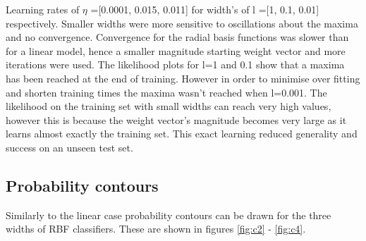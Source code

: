 \documentclass[twoside,twocolumn]{article}
\begin{document}
Learning rates of $\eta$ =[0.0001, 0.015, 0.011] for width's of l =[1, 0.1, 0.01] respectively. Smaller widths were more sensitive to oscillations about the maxima and no convergence. Convergence for the radial basis functions was slower than for a linear model, hence a smaller magnitude starting weight vector and more iterations were used. The likelihood plots for l=1 and 0.1 show that a maxima has been reached at the end of training. However in order to minimise over fitting and shorten training times the maxima wasn't reached when l=0.001. The likelihood on the training set with small widths can reach very high values, however this is because the weight vector's magnitude becomes very large as it learns almost exactly the training set. This exact learning reduced generality and success on an unseen test set.
\subsection{Probability contours}
Similarly to the linear case probability contours can be drawn for the three widths of RBF classifiers. These are shown in figures \ref{fig:c2} - \ref{fig:c4}.
\end{document}
